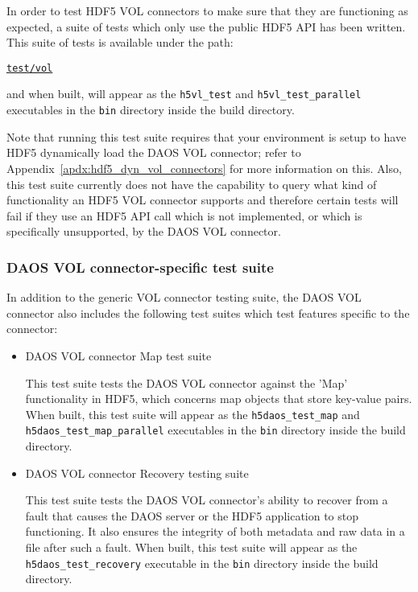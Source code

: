 In order to test HDF5 VOL connectors to make sure that they are functioning as expected, a suite of tests which only use the public HDF5 API has been written. This suite of tests is available under the path:

\href{https://bitbucket.hdfgroup.org/projects/HDF5VOL/repos/daos-vol/browse/test}{\texttt{test/vol}}

and when built, will appear as the \texttt{h5vl\_test} and \texttt{h5vl\_test\_parallel} executables in the \texttt{bin} directory inside the build directory.

Note that running this test suite requires that your environment is setup to have HDF5 dynamically load the DAOS VOL connector; refer to Appendix~\ref{apdx:hdf5_dyn_vol_connectors} for more information on this. Also, this test suite currently does not have the capability to query what kind of functionality an HDF5 VOL connector supports and therefore certain tests will fail if they use an HDF5 API call which is not implemented, or which is specifically unsupported, by the DAOS VOL connector.

\subsubsection{DAOS VOL connector-specific test suite}

In addition to the generic VOL connector testing suite, the DAOS VOL connector also includes the following test suites which test features specific to the connector:

\begin{itemize}
    \item DAOS VOL connector Map test suite

    This test suite tests the DAOS VOL connector against the 'Map' functionality in HDF5, which concerns map objects that store key-value pairs. When built, this test suite will appear as the \texttt{h5daos\_test\_map} and \texttt{h5daos\_test\_map\_parallel} executables in the \texttt{bin} directory inside the build directory.

    \item DAOS VOL connector Recovery testing suite

    This test suite tests the DAOS VOL connector's ability to recover from a fault that causes the DAOS server or the HDF5 application to stop functioning. It also ensures the integrity of both metadata and raw data in a file after such a fault. When built, this test suite will appear as the \texttt{h5daos\_test\_recovery} executable in the \texttt{bin} directory inside the build directory.
\end{itemize}
